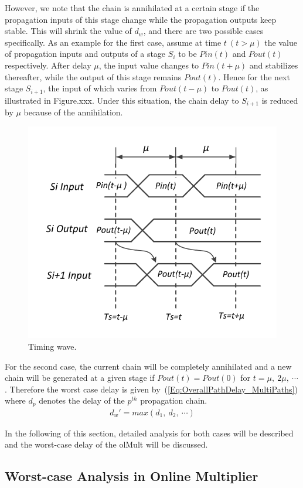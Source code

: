\documentclass[a4paper, 11pt]{article}
\begin{document}
However, we note that the chain is annihilated at a certain stage if the propagation inputs of this stage change while the propagation outputs keep stable. This will shrink the value of $d_w$, and there are two possible cases specifically. As an example for the first case, assume at time $t~(t>\mu)$ the value of propagation inputs and outputs of a stage $S_i$ to be $Pin(t)$ and $Pout(t)$ respectively. After delay $\mu$, the input value changes to $Pin(t+\mu)$ and stabilizes thereafter, while the output of this stage remains $Pout(t)$. Hence for the next stage $S_{i+1}$, the input of which varies from $Pout(t-\mu)$ to $Pout(t)$, as illustrated in Figure.xxx. Under this situation, the chain delay to $S_{i+1}$ is reduced by $\mu$ because of the annihilation.
%
\begin{figure}[htbp]
  \centering
  \includegraphics[width=.5\textwidth]{./Figures/TimingWave.pdf}
  \caption{Timing wave.}
\end{figure}

For the second case, the current chain will be completely annihilated and a new chain will be generated at a given stage if $Pout(t)=Pout(0)$ for $t=\mu,~2\mu,~\cdots$. Therefore the worst case delay is given by~(\ref{Eq:OverallPathDelay_MultiPaths}) where $d_p$ denotes the delay of the $p^{th}$ propagation chain.
\begin{eqnarray}\label{Eq:OverallPathDelay_MultiPaths}
  d_w'=max(d_1,~d_2,~\cdots)
\end{eqnarray}

In the following of this section, detailed analysis for both cases will be described and the worst-case delay of the olMult will be discussed.

\subsection{Worst-case Analysis in Online Multiplier}
\end{document}
